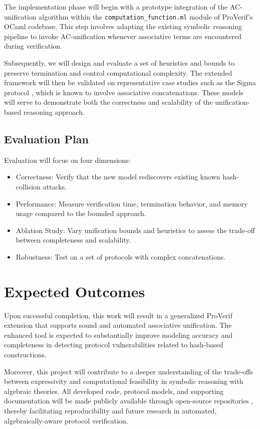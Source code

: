 \documentclass[journal]{IEEEtran}
\begin{document}
The implementation phase will begin with a prototype integration of the AC-unification algorithm within the \texttt{computation\_function.ml} module of ProVerif’s OCaml codebase. This step involves adapting the existing symbolic reasoning pipeline to invoke AC-unification whenever associative terms are encountered during verification. 

Subsequently, we will design and evaluate a set of heuristics and bounds to preserve termination and control computational complexity. The extended framework will then be validated on representative case studies such as the Sigma protocol \cite{cheval2023hash}, which is known to involve associative concatenations. These models will serve to demonstrate both the correctness and scalability of the unification-based reasoning approach.

\subsection{Evaluation Plan}

Evaluation will focus on four dimensions: 
\begin{itemize} 
    \item Correctness: Verify that the new model rediscovers existing known hash-collision attacks. 
    \item Performance: Measure verification time, termination behavior, and memory usage compared to the bounded approach. 
    \item Ablation Study: Vary unification bounds and heuristics to assess the trade-off between completeness and scalability. 
    \item Robustness: Test on a set of protocols with complex concatenations. 
\end{itemize}

\section{Expected Outcomes}

Upon successful completion, this work will result in a generalized ProVerif extension that supports sound and automated associative unification. The enhanced tool is expected to substantially improve modeling accuracy and completeness in detecting protocol vulnerabilities related to hash-based constructions. 

Moreover, this project will contribute to a deeper understanding of the trade-offs between expressivity and computational feasibility in symbolic reasoning with algebraic theories. All developed code, protocol models, and supporting documentation will be made publicly available through open-source repositories \cite{our_repo, our_docker}, thereby facilitating reproducibility and future research in automated, algebraically-aware protocol verification.
\end{document}
